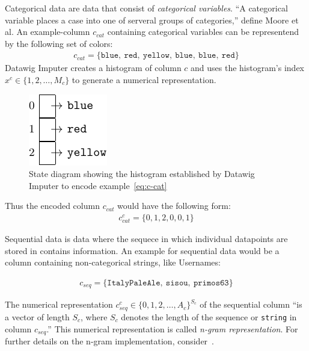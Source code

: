 Categorical data are data that consist of \emph{categorical variables}.
``A categorical variable places a case into one of serveral groups of categories,{''} define Moore et al.\cite[p.~4]{MOO11}
An example-column \( c_{cat} \) containing categorical variables can be representend by the following set of colors:
\begin{align}\label{eq:c-cat}
    c_{cat} = \{ \texttt{blue},~\texttt{red},~\texttt{yellow},~\texttt{blue},~\texttt{blue},~\texttt{red} \}
\end{align}
Datawig Imputer creates a histogram of column \( c \) and uses the histogram's index \( x^c \in \{1, 2, \dots, M_c \} \) to generate a numerical representation.
\begin{figure}[ht]
    \centering
    \includegraphics[width=.3\textwidth]{images/state_diagrams/color_histogram}
    \caption{State diagram showing the histogram established by Datawig Imputer to encode example~\ref{eq:c-cat}}
    \label{fig:state-diagram-color}
\end{figure}
Thus the encoded column \( c_{cat} \) would have the following form:
\begin{align}
    c_{cat}^{c} = \{ 0, 1, 2, 0, 0, 1\}
\end{align}

Sequential data is data where the sequece in which individual datapoints are stored in contains information.
An example for sequential data would be a column containing non-categorical strings, like Usernames:

\begin{align}
    c_{seq} = \{ \texttt{ItalyPaleAle},~\texttt{sisou},~\texttt{primos63} \}
\end{align}

The numerical representation \( c_{seq}^{c} \in \{ 0, 1, 2, \dots, A_c \}^{S_c} \) of the sequential column ``is a vector of length \( S_c \), where \( S_c \) denotes the length of the sequence or \texttt{string} in column \( c_{seq} \).''\cite[p.2020]{BIE18}
This numerical representation is called \emph{n-gram representation}.
For further details on the n-gram implementation, consider~\cite[p.2020]{BIE18}.

